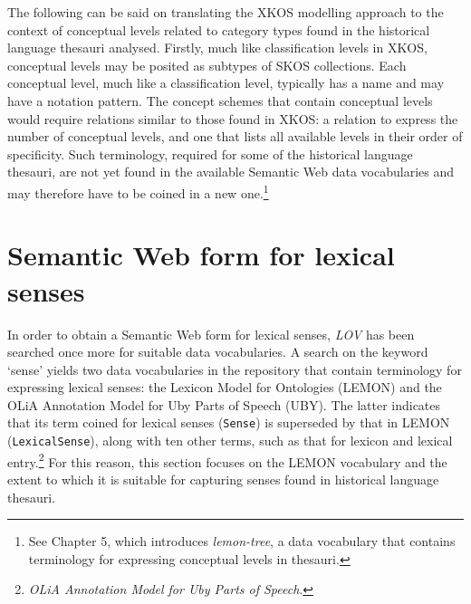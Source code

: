 The following can be said on translating the XKOS modelling approach to the context of conceptual levels related to category types found in the historical language thesauri analysed. Firstly, %
much like classification levels in XKOS, conceptual levels may be posited as subtypes of SKOS collections. Each conceptual level, much like a classification level, typically has a name and may have a notation pattern. The concept schemes that contain conceptual levels would require relations similar to those found in XKOS: a relation to express the number of conceptual levels, and one that lists all available levels in their order of specificity. Such terminology, required for some of the historical language thesauri, are not yet found in the available Semantic Web data vocabularies and may therefore have to be coined in a new one.\footnote{See Chapter 5, which introduces \textit{lemon-tree}, a data vocabulary that contains terminology for expressing conceptual levels in thesauri.} 

\section{Semantic Web form for lexical senses}
\label{sect:Stolk_thes-digital-form:semweb-senses}
In order to obtain a Semantic Web form for lexical senses, \textit{LOV} has been searched once more for suitable data vocabularies. A search on the keyword `sense' yields two data vocabularies in the repository that contain terminology for expressing lexical senses: the Lexicon Model for Ontologies (LEMON) and the OLiA Annotation Model for Uby Parts of Speech (UBY). The latter indicates that its term coined for lexical senses (\texttt{Sense}) is superseded by that in LEMON (\texttt{LexicalSense}), along with ten other terms, such as that for lexicon and lexical entry.\footnote{\textit{OLiA Annotation Model for Uby Parts of Speech}.} %
For this reason, this section focuses on the LEMON vocabulary and the extent to which it is suitable for capturing senses found in historical language thesauri.

